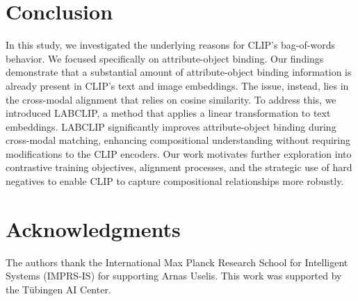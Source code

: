 \section{Conclusion}
In this study, we investigated the underlying reasons for CLIP's bag-of-words behavior. We focused specifically on attribute-object binding. Our findings demonstrate that a substantial amount of attribute-object binding information is already present in CLIP’s text and image embeddings. The issue, instead, lies in the cross-modal alignment that relies on cosine similarity. To address this, we introduced LABCLIP, a method that applies a linear transformation to text embeddings. LABCLIP significantly improves attribute-object binding during cross-modal matching, enhancing compositional understanding without requiring modifications to the CLIP encoders. Our work motivates further exploration into contrastive training objectives, alignment processes, and the strategic use of hard negatives to enable CLIP to capture compositional relationships more robustly.


\section{Acknowledgments}

The authors thank the International Max Planck Research School for Intelligent Systems (IMPRS-IS) for supporting Arnas Uselis. This work was supported by the Tübingen AI Center.

